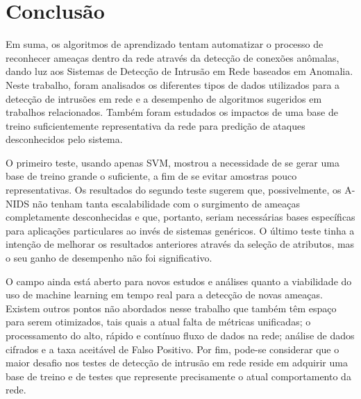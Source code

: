\chapter{Conclusão}
\label{ch:conclusao}

Em suma, os algoritmos de aprendizado tentam automatizar o processo de reconhecer ameaças dentro da rede
através da detecção de conexões anômalas, dando luz aos Sistemas de Detecção de Intrusão em Rede baseados em Anomalia.
Neste trabalho, foram analisados os diferentes tipos de dados utilizados para a detecção de intrusões em rede e a
desempenho de algoritmos sugeridos em trabalhos relacionados. Também foram estudados os impactos de uma base de
treino suficientemente representativa da rede para predição de ataques desconhecidos pelo sistema.
\par O primeiro teste, usando apenas SVM, mostrou a necessidade de se gerar uma base de treino grande o suficiente, a
fim de se evitar amostras pouco representativas. Os resultados do segundo teste sugerem que, possivelmente, os A-NIDS
não tenham tanta escalabilidade com o surgimento de ameaças completamente desconhecidas e que, portanto, seriam
necessárias bases específicas para aplicações particulares ao invés de sistemas genéricos. O último teste tinha a
intenção de melhorar os resultados anteriores através da seleção de atributos, mas o seu ganho de desempenho não foi
significativo.
\par O campo ainda está aberto para novos estudos e análises quanto a viabilidade do uso de machine learning em tempo
real para a detecção de novas ameaças. Existem outros pontos não abordados nesse trabalho que também têm espaço para
serem otimizados, tais quais a atual falta de métricas unificadas; o processamento do alto, rápido e contínuo fluxo de
dados na rede; análise de dados cifrados e a taxa aceitável de Falso Positivo. Por fim, pode-se considerar que
 o maior desafio nos testes de detecção de intrusão em rede reside em adquirir uma base de treino e de testes que
 represente precisamente o atual comportamento da rede.